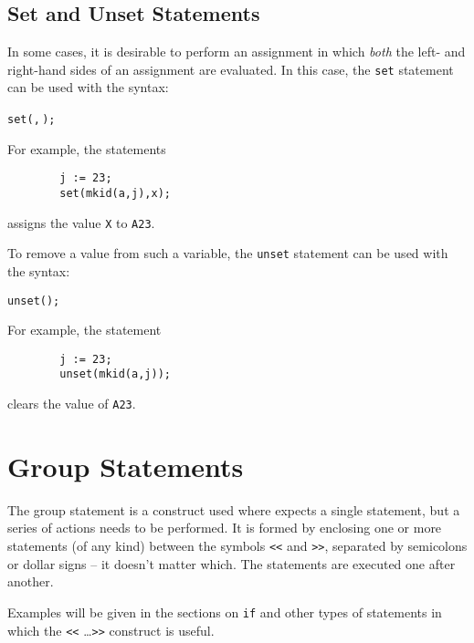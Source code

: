 \subsection{Set and Unset Statements}
\hypertarget{command:SET}{}
\hypertarget{command:UNSET}{}

In some cases, it is desirable to perform an assignment in which \emph{both}
the left- and right-hand sides of an assignment are
evaluated.  In this case, the \texttt{set} statement can
be used with the syntax:
\begin{syntax}
  \texttt{set(}\texttt{,}\,\texttt{);}
\end{syntax}
For example, the statements
\begin{verbatim}
        j := 23;
        set(mkid(a,j),x);
\end{verbatim}
assigns the value \texttt{X} to \texttt{A23}.

To remove a value from such a variable, the \texttt{unset}
statement can be used with the syntax:
\begin{syntax}
        \texttt{unset(}\texttt{);}
\end{syntax}
For example, the statement
\begin{verbatim}
        j := 23;
        unset(mkid(a,j));
\end{verbatim}
clears the value of \texttt{A23}.

\section{Group Statements}

The group statement
 is a construct used where
{\REDUCE} expects a single statement, but a series of actions needs to be
performed.  It is formed by enclosing one or more statements (of any kind)
between the symbols \texttt{<}\texttt{<} and \texttt{>}\texttt{>},
separated by semicolons or
dollar signs -- it doesn't matter which.  The statements are executed one
after another.

Examples will be given in the sections on \texttt{if} and other
types of statements in which the \texttt{<}\texttt{<} \ldots \texttt{>}\texttt{>}
construct is useful.

